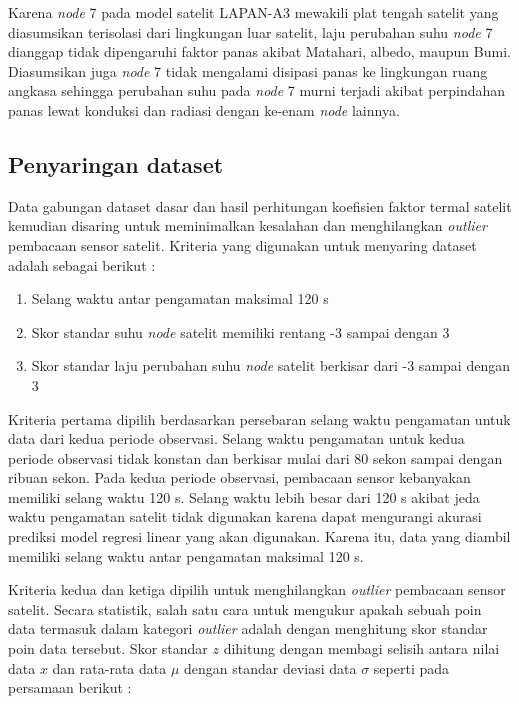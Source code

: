 Karena \textit{node} 7 pada model satelit LAPAN-A3 mewakili plat tengah satelit
yang diasumsikan terisolasi dari lingkungan luar satelit, laju perubahan suhu
\textit{node} 7 dianggap tidak dipengaruhi faktor panas akibat Matahari,
albedo, maupun Bumi. Diasumsikan juga \textit{node} 7 tidak mengalami disipasi
panas ke lingkungan ruang angkasa sehingga perubahan suhu pada \textit{node} 7
murni terjadi akibat perpindahan panas lewat konduksi dan radiasi dengan
ke-enam \textit{node} lainnya.

\subsection{Penyaringan dataset}

Data gabungan dataset dasar dan hasil perhitungan koefisien faktor termal
satelit kemudian disaring untuk meminimalkan kesalahan dan menghilangkan
\textit{outlier} pembacaan sensor satelit. Kriteria yang digunakan untuk
menyaring dataset adalah sebagai berikut :

\begin{enumerate}
\item Selang waktu antar pengamatan maksimal 120 s 
\item Skor standar suhu \textit{node} satelit memiliki rentang -3 sampai dengan 3
\item Skor standar laju perubahan suhu \textit{node} satelit berkisar dari -3 sampai dengan 3 
\end{enumerate}

Kriteria pertama dipilih berdasarkan persebaran selang waktu pengamatan untuk
data dari kedua periode observasi. Selang waktu pengamatan untuk kedua periode
observasi tidak konstan dan berkisar mulai dari 80 sekon sampai dengan ribuan
sekon. Pada kedua periode observasi, pembacaan sensor kebanyakan memiliki
selang waktu 120 s. Selang waktu lebih besar dari 120 s akibat jeda waktu
pengamatan satelit tidak digunakan karena dapat mengurangi akurasi prediksi
model regresi linear yang akan digunakan. Karena itu, data yang diambil
memiliki selang waktu antar pengamatan maksimal 120 s.

Kriteria kedua dan ketiga dipilih untuk menghilangkan \textit{outlier}
pembacaan sensor satelit. Secara statistik, salah satu cara untuk mengukur
apakah sebuah poin data termasuk dalam kategori \textit{outlier} adalah dengan
menghitung skor standar poin data tersebut. Skor standar $z$ dihitung dengan
membagi selisih antara nilai data $x$ dan rata-rata data $\mu$ dengan standar deviasi
data $\sigma$ seperti pada persamaan berikut \cite{massaron}:

